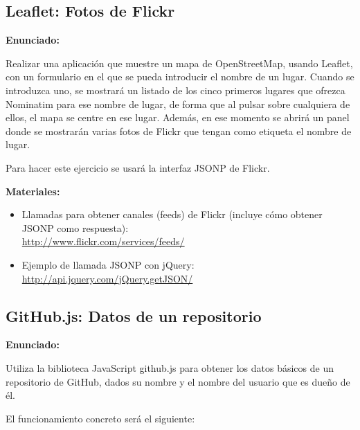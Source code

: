 \subsection{Leaflet: Fotos de Flickr}
\label{subsec:apis-leaflet-flickr}

\textbf{Enunciado:}

Realizar una aplicación que muestre un mapa de OpenStreetMap, usando Leaflet, con un formulario en el que se pueda introducir el nombre de un lugar. Cuando se introduzca uno, se mostrará un listado de los cinco primeros lugares que ofrezca Nominatim para ese nombre de lugar, de forma que al pulsar sobre cualquiera de ellos, el mapa se centre en ese lugar. Además, en ese momento se abrirá un panel donde se mostrarán varias fotos de Flickr que tengan como etiqueta el nombre de lugar.

Para hacer este ejercicio se usará la interfaz JSONP de Flickr.

\textbf{Materiales:}

\begin{itemize}
\item Llamadas para obtener canales (feeds) de Flickr (incluye cómo obtener JSONP como respuesta): \\
  \url{http://www.flickr.com/services/feeds/}
\item Ejemplo de llamada JSONP con jQuery: \\
  \url{http://api.jquery.com/jQuery.getJSON/}
\end{itemize}


\subsection{GitHub.js: Datos de un repositorio}
\label{subsec:apis-github-repo}

\textbf{Enunciado:}

Utiliza la biblioteca JavaScript github.js para obtener los datos básicos de un repositorio de GitHub, dados su nombre y el nombre del usuario que es dueño de él.

El funcionamiento concreto será el siguiente:

